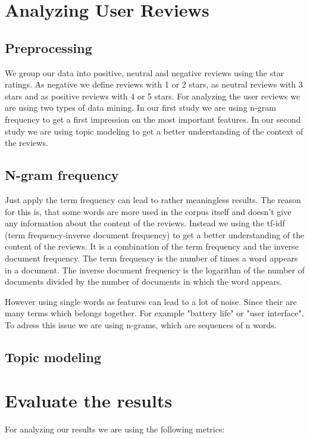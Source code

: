 \section{Analyzing User Reviews}
\subsection{Preprocessing}
We group our data into positive, neutral and negative reviews using the star ratings.
As negative we define reviews with 1 or 2 stars, as neutral reviews with 3 stars and as positive reviews with 4 or 5 stars.
\label{sec:analyzing-user-reviews}
For analyzing the user reviews we are using two types of data mining.
In our first study we are using n-gram frequency to get a first impression on the most important features.
In our second study we are using topic modeling to get a better understanding of the context of the reviews.
\subsection{N-gram frequency}
\label{sec:n-gram-frequency}
Just apply the term frequency can lead to rather meaningless results.
The reason for this is, that some words are more used in the corpus itself and doesn't give any information about the content of the reviews.
Instead we using the tf-idf (term frequency-inverse document frequency) to get a better understanding of the content of the reviews.
It is a combination of the term frequency and the inverse document frequency.
The term frequency is the number of times a word appears in a document.
The inverse document frequency is the logarithm of the number of documents divided by the number of documents in which the word appears.

However using single words as features can lead to a lot of noise.
Since their are many terms which belongs together. For example "battery life" or "user interface".
To adress this issue we are using n-grams, which are sequences of n words.



\subsection{Topic modeling}
\section{Evaluate the results}

For analyzing our results we are using the following metrics:
